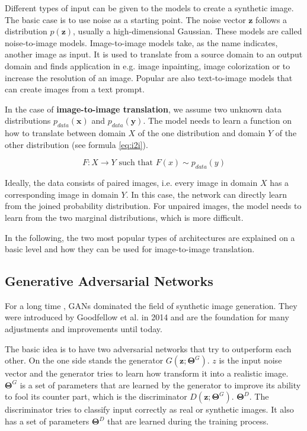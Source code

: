 Different types of input can be given to the models to create a synthetic image. The basic case is to use noise as a starting point. The noise 
vector $\boldsymbol{z}$ follows a distribution $p(\boldsymbol{z})$, usually a high-dimensional Gaussian. These models are called noise-to-image 
models. Image-to-image models take, as the name indicates, another image as input. It is used to translate from a source domain to an output 
domain \cite{pang_image--image_2022} 
and finds application in e.g. image inpainting, image colorization or to increase the resolution of an image. Popular are also 
text-to-image models that can create images from a text prompt.

In the case of \textbf{image-to-image translation}, we assume two unknown data distributions $p_{data}(\boldsymbol{x})$ and $p_{data}(\boldsymbol{y})$.
The model needs to learn a function on how to translate between domain $X$ of the one distribution and domain $Y$ of the other distribution (see
formula \ref{eq:i2i}).

\begin{equation}
    F: X \rightarrow Y \text{ such that } F(x) \sim p_{data}(y)
    \label{eq:i2i}
\end{equation}

Ideally, the data consists of paired images, i.e. every image in domain $X$ has a corresponding image in domain $Y$. In this case, the network can 
directly learn from the joined probability distribution. For unpaired images, the model needs to learn from the two marginal distributions, which
is more difficult.

In the following, the two most popular types of architectures are explained on a basic level and how they can be used for image-to-image translation. 

\subsection{Generative Adversarial Networks}

For a long time , GANs dominated the field of synthetic image generation. They were introduced by 
Goodfellow et al. \cite{goodfellow_generative_2020}
in 2014 and are the foundation for many adjustments and improvements until today. 

The basic idea is to have two adversarial networks that try to outperform each other. On the one side stands the generator 
$G(\boldsymbol{z}; \boldsymbol{\Theta}^{G})$. $z$ is the input noise vector and the generator tries to learn how transform it into a realistic image. 
$\boldsymbol{\Theta}^{G}$ is a set of parameters that are learned by the generator to improve its 
ability to fool its counter part, which is the discriminator $D(\boldsymbol{z}; \boldsymbol{\Theta}^{G})$. $\boldsymbol{\Theta}^{D}$. 
The discriminator tries to classify input correctly as real or synthetic images. It also has a set of parameters $\boldsymbol{\Theta}^{D}$ that are 
learned during the training process.

